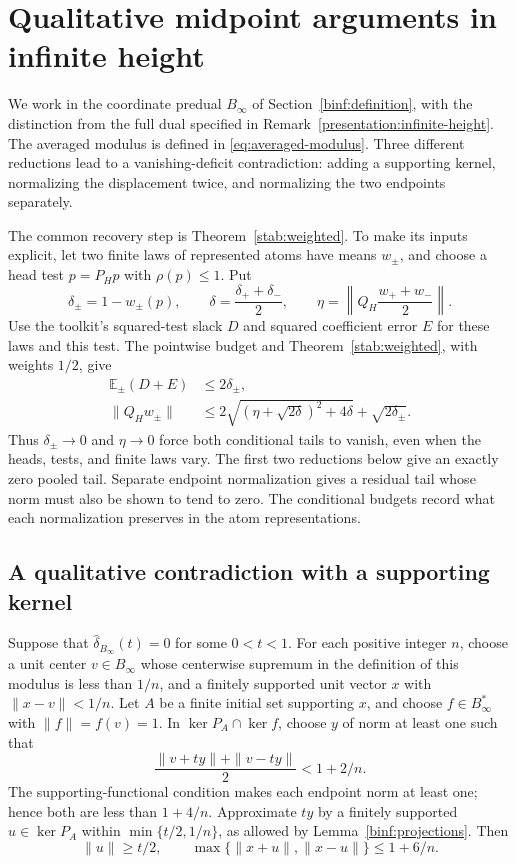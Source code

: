 \section{Qualitative midpoint arguments in infinite height}\label{sec:qualitative-infinite}

We work in the coordinate predual $B_\infty$ of
Section~\ref{binf:definition}, with the distinction from the full dual
specified in Remark~\ref{presentation:infinite-height}. The averaged
modulus is defined in \eqref{eq:averaged-modulus}. Three different
reductions lead to a vanishing-deficit contradiction: adding a
supporting kernel, normalizing the displacement twice, and
normalizing the two endpoints separately.

The common recovery step is Theorem~\ref{stab:weighted}. To make its
inputs explicit, let two finite laws of represented atoms have means
$w_\pm$, and choose a head test $p=P_Hp$ with $\rho(p)\le1$. Put
\[
 \delta_\pm=1-w_\pm(p),\qquad
 \delta=\frac{\delta_++\delta_-}{2},\qquad
 \eta=\left\|Q_H\frac{w_++w_-}{2}\right\|.
\]
Use the toolkit's squared-test slack $D$ and squared coefficient error
$E$ for these laws and this test. The pointwise budget and
Theorem~\ref{stab:weighted}, with weights $1/2$, give
\begin{align}
 \mathbb E_\pm(D+E)&\le2\delta_\pm,
       \label{qual:conditional-budget}\\
 \|Q_Hw_\pm\|&\le
 2\sqrt{(\eta+\sqrt{2\delta})^2+4\delta}
       +\sqrt{2\delta_\pm}.
       \label{qual:conditional-recovery}
\end{align}
Thus $\delta_\pm\to0$ and $\eta\to0$ force both conditional tails
to vanish, even when the heads, tests, and finite laws vary. The first
two reductions below give an exactly zero pooled tail. Separate
endpoint normalization gives a residual tail whose norm must also be
shown to tend to zero. The conditional budgets record what each
normalization preserves in the atom representations.

\subsection{A qualitative contradiction with a supporting kernel}
\label{mold:qualitative}
Suppose that \(\widehat\delta_{B_\infty}(t)=0\) for some
\(0<t<1\).  For each positive integer \(n\), choose a unit center
\(v\in B_\infty\) whose centerwise supremum in the definition of this
modulus is less than \(1/n\), and a finitely supported unit vector \(x\) with
\(\|x-v\|<1/n\).  Let \(A\) be a finite initial set supporting \(x\), and
choose \(f\in B_\infty^*\) with \(\|f\|=f(v)=1\).  In
\(\ker P_A\cap\ker f\), choose \(y\) of norm at least one such that
\[
 \frac{\|v+ty\|+\|v-ty\|}{2}<1+2/n.
\]
The supporting-functional condition makes each endpoint norm at least one;
hence both are less than \(1+4/n\).  Approximate \(ty\) by a finitely
supported \(u\in\ker P_A\) within \(\min\{t/2,1/n\}\), as allowed by
Lemma~\ref{binf:projections}.  Then
\[
 \|u\|\ge t/2,\qquad
 \max\{\|x+u\|,\|x-u\|\}\le1+6/n.
\]

